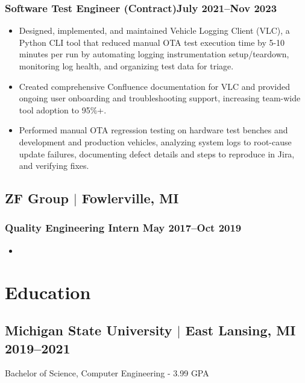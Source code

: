 \documentclass[11pt]{article} %
\begin{document}
\subsubsection{Software Test Engineer (Contract)\hfill July 2021--Nov 2023}
\begin{itemize}
	\item Designed, implemented, and maintained Vehicle Logging Client (VLC),
	a Python CLI tool that reduced manual OTA test execution time by 5-10 minutes per run
	by automating logging instrumentation setup/teardown, monitoring log health, and 
	organizing test data for triage. 
	\item Created comprehensive Confluence documentation for VLC and provided ongoing
	user onboarding and troubleshooting support, increasing team-wide tool adoption to 95\%+.
	\item Performed manual OTA regression testing on hardware test benches and development and 
	production vehicles, analyzing system logs to root-cause update failures, 
	documenting defect details and steps to reproduce in Jira, and verifying fixes.
\end{itemize}

\subsection{ZF Group $|$ {\normalfont Fowlerville, MI}}
\subsubsection{Quality Engineering Intern \hfill May 2017--Oct 2019}
\begin{itemize}
	\item 
\end{itemize}

\section{Education}
\subsection{Michigan State University $|$ {\normalfont East Lansing, MI} \hfill 2019--2021}
\noindent Bachelor of Science, Computer Engineering - 3.99 GPA

\end{document}

